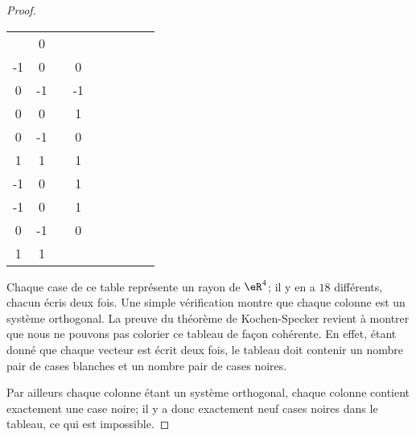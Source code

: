 \begin{proof}
\begin{tabular}{c|c|c|c|c|c|c|c|c}
		\hline
		\( \begin{matrix}
				1  & 0 \\
				-1 & 0
			\end{matrix}\)
		 &
		\( \begin{matrix}
				1 & 0  \\
				0 & -1
			\end{matrix}\)
		 &
		\( \begin{matrix}
				1 & -1 \\
				0 & 0
			\end{matrix}\)
		 &
		\( \begin{matrix}
				0 & 1  \\
				0 & -1
			\end{matrix}\)
		 &
		\( \begin{matrix}
				0 & 0 \\
				1 & 1
			\end{matrix}\)
		 &
		\( \begin{matrix}
				0  & 1 \\
				-1 & 0
			\end{matrix}\)
		 &
		\( \begin{matrix}
				0  & 1 \\
				-1 & 0
			\end{matrix}\)
		 &
		\( \begin{matrix}
				0 & 1  \\
				0 & -1
			\end{matrix}\)
		 &
		\( \begin{matrix}
				0 & 0 \\
				1 & 1
			\end{matrix}\) \\
		\hline
	\end{tabular}

	Chaque case de ce table représente un rayon de \( \eR^4\); il y en a \( 18\) différents, chacun écris deux fois. Une simple vérification montre que chaque colonne est un système orthogonal. La preuve du théorème de Kochen-Specker revient à montrer que nous ne pouvons pas colorier ce tableau de façon cohérente. En effet, étant donné que chaque vecteur est écrit deux fois, le tableau doit contenir un nombre pair de cases blanches et un nombre pair de cases noires.

	Par ailleurs chaque colonne étant un système orthogonal, chaque colonne contient exactement une case noire; il y a donc exactement neuf cases noires dans le tableau, ce qui est impossible.

\end{proof}

